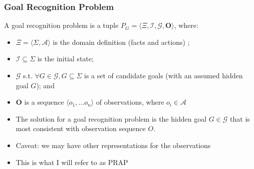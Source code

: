 \documentclass{beamer}
\begin{document}
    \begin{frame}[c]\frametitle{Goal Recognition Problem}
		\begin{definition}
			A goal recognition problem is a tuple $P_{G} = \langle \Xi, \mathcal{I}, \mathcal{G}, \mathbf{O} \rangle$, where:
       	\begin{itemize}
       		\item $\Xi = \langle \Sigma, \mathcal{A} \rangle$ is the domain definition (facts and actions) ;
       		\item $\mathcal{I} \subseteq \Sigma$ is the initial state;
       		\item $\mathcal{G}$ s.t. $\forall{G \in \mathcal{G}}, G \subseteq \Sigma$ is a set of candidate goals (with an assumed hidden goal $G$); and
       		\item $\mathbf{O}$ is a sequence $\langle o_1, \dots o_n \rangle$ of observations, where $o_i \in \mathcal{A}$
       	\end{itemize}
       	\end{definition}
        
        \begin{itemize}
        	\item The solution for a goal recognition problem is the hidden goal $G \in \mathcal{G}$ that is most consistent with observation sequence $O$.
        	\item Caveat: we may have other representations for the observations
        	\item This is what I will refer to as PRAP
        \end{itemize}
    \end{frame}	
 
\end{document}
